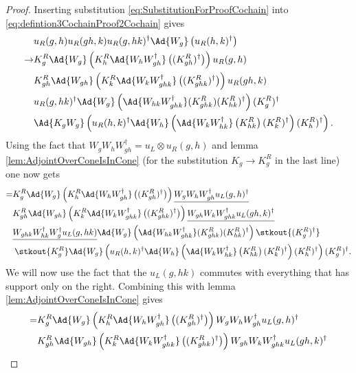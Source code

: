 \begin{proof}
	Inserting substitution \eqref{eq:SubstitutionForProofCochain} into \eqref{eq:defintion3CochainProof2Cochain} gives
	\begin{align}
		&u_R(g,h)u_R(gh,k)u_R(g,hk)^\dagger\Ad{W_g}\left(u_R(h,k)^\dagger\right)\\
		\rightarrow&K_g^R\Ad{W_g}\left(K_h^R\Ad{W_hW_{gh}^\dagger}\left((K_{gh}^R)^\dagger\right)\right)u_
		R(g,h)\\
		\nonumber
		&K_{gh}^R\Ad{W_{gh}}\left(K_k^R\Ad{W_kW_{ghk}^\dagger}\left((K_{ghk}^R)^\dagger\right)\right)u_
		R(gh,k)\\
		\nonumber
		&u_R(g,hk)^\dagger \Ad{W_g}\left( \Ad{W_{hk}W_{ghk}^\dagger}(K^R_{ghk})(K^R_{hk})^{\dagger} \right)(K^R_g)^\dagger\\
		\nonumber
		&\Ad{K_gW_g}\left(u_R(h,k)^\dagger \Ad{W_h}\left(\Ad{W_kW_{hk}^\dagger}\left(K_{hk}^R\right)(K^R_k)^\dagger\right)(K^R_h)^\dagger\right).
	\end{align}
	Using the fact that $W_gW_hW_{gh}^\dagger=u_L\otimes u_R(g,h)$ and lemma \ref{lem:AdjointOverConeIsInCone} (for the substitution $K_g\rightarrow K_g^R$ in the last line) one now gets
	\begin{align}
		=&K_g^R\Ad{W_g}\left(K_h^R\Ad{W_hW_{gh}^\dagger}\left((K_{gh}^R)^\dagger\right)\right)\underline{W_gW_hW_{gh}^\dagger u_L(g,h)^\dagger}\\
		\nonumber
		&K_{gh}^R\Ad{W_{gh}}\left(K_k^R\Ad{W_kW_{ghk}^\dagger}\left((K_{ghk}^R)^\dagger\right)\right) \underline{W_{gh}W_kW_{ghk}^\dagger u_L(gh,k)^\dagger}\\
		\nonumber
		&\underline{W_{ghk}W_{hk}^\dagger W_{g}^\dagger u_L(g,hk)} \Ad{W_g}\left( \Ad{W_{hk}W_{ghk}^\dagger}(K^R_{ghk})(K^R_{hk})^{\dagger} \right)\stkout{(K^R_g)^\dagger}\\
		\nonumber
		&\:\stkout{K^R_g}\Ad{W_g}\left(u_R(h,k)^\dagger \Ad{W_h}\left(\Ad{W_kW_{hk}^\dagger}\left(K_{hk}^R\right)(K^R_k)^\dagger\right)(K^R_h)^\dagger\right)(K^R_g)^\dagger.
	\end{align}
	We will now use the fact that the $u_L(g,hk)$ commutes with everything that has support only on the right. Combining this with lemma \ref{lem:AdjointOverConeIsInCone} gives
	\begin{align}
		=&K_g^R\Ad{W_g}\left(K_h^R\Ad{W_hW_{gh}^\dagger}\left((K_{gh}^R)^\dagger\right)\right)W_gW_hW_{gh}^\dagger u_L(g,h)^\dagger\\
		\nonumber
		&K_{gh}^R\Ad{W_{gh}}\left(K_k^R\Ad{W_kW_{ghk}^\dagger}\left((K_{ghk}^R)^\dagger\right)\right) W_{gh}W_kW_{ghk}^\dagger u_L(gh,k)^\dagger\\

\end{align}
\end{proof}
